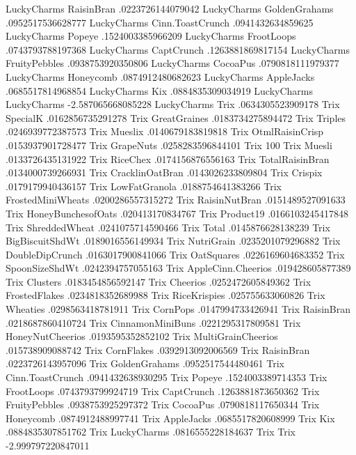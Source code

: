 LuckyCharms	RaisinBran	.0223726144079042
LuckyCharms	GoldenGrahams	.0952517536628777
LuckyCharms	Cinn.ToastCrunch	.0941432634859625
LuckyCharms	Popeye	.1524003385966209
LuckyCharms	FrootLoops	.0743793788197368
LuckyCharms	CaptCrunch	.1263881869817154
LuckyCharms	FruityPebbles	.0938753920350806
LuckyCharms	CocoaPus	.0790818111979377
LuckyCharms	Honeycomb	.0874912480682623
LuckyCharms	AppleJacks	.0685517814968854
LuckyCharms	Kix	.0884835309034919
LuckyCharms	LuckyCharms	-2.587065668085228
LuckyCharms	Trix	.0634305523909178
Trix	SpecialK	.0162856735291278
Trix	GreatGraines	.0183734275894472
Trix	Triples	.0246939772387573
Trix	Mueslix	.0140679183819818
Trix	OtmlRaisinCrisp	.0153937901728477
Trix	GrapeNuts	.0258283596844101
Trix	100%
Trix	Muesli	.0133726435131922
Trix	RiceChex	.0174156876556163
Trix	TotalRaisinBran	.0134000739266931
Trix	CracklinOatBran	.0143026233809804
Trix	Crispix	.0179179940436157
Trix	LowFatGranola	.0188754641383266
Trix	FrostedMiniWheats	.0200286557315272
Trix	RaisinNutBran	.0151489527091633
Trix	HoneyBunchesofOats	.020413170834767
Trix	Product19	.0166103245417848
Trix	ShreddedWheat	.0241075714590466
Trix	Total	.0145876628138239
Trix	BigBiscuitShdWt	.0189016556149934
Trix	NutriGrain	.0235201079296882
Trix	DoubleDipCrunch	.0163017900841066
Trix	OatSquares	.0226169604683352
Trix	SpoonSizeShdWt	.0242394757055163
Trix	AppleCinn.Cheerios	.019428605877389
Trix	Clusters	.0183454856592147
Trix	Cheerios	.0252472605849362
Trix	FrostedFlakes	.0234818352689988
Trix	RiceKrispies	.025755633060826
Trix	Wheaties	.0298563418781911
Trix	CornPops	.0147994733426941
Trix	RaisinBran	.0218687860410724
Trix	CinnamonMiniBuns	.0221295317809581
Trix	HoneyNutCheerios	.0193595352852102
Trix	MultiGrainCheerios	.015738909088742
Trix	CornFlakes	.0392913092006569
Trix	RaisinBran	.0223726143957096
Trix	GoldenGrahams	.0952517544480461
Trix	Cinn.ToastCrunch	.0941432638930295
Trix	Popeye	.1524003389714353
Trix	FrootLoops	.0743793799924719
Trix	CaptCrunch	.1263881873650362
Trix	FruityPebbles	.0938753925297372
Trix	CocoaPus	.0790818117650344
Trix	Honeycomb	.0874912488997741
Trix	AppleJacks	.0685517820608999
Trix	Kix	.0884835307851762
Trix	LuckyCharms	.0816555228184637
Trix	Trix	-2.999797220847011
